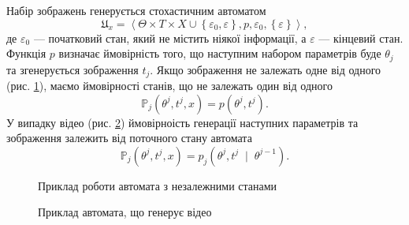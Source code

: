 Набір зображень генерується стохастичним автоматом \cite{Rabin:1963}
\begin{equation*}
  \mathfrak{U}_x = \left\langle
    \Theta \times T \times X
      \cup \left\{ \varepsilon_0, \varepsilon \right\}, p, \varepsilon_0,
    \left\{ \varepsilon \right\}
  \right\rangle,
\end{equation*}
де $\varepsilon_0$ --- початковий стан, який не містить ніякої інформації,
а $\varepsilon$ --- кінцевий стан.
Функція $p$ визначає ймовірність того,
що наступним набором параметрів буде $\theta_j$
та згенерується зображення $t_j$.
Якщо зображення не залежать одне від одного
(рис. \ref{fig:solutions:tree-images}),
маємо ймовірності станів,
що не залежать один від одного
\begin{equation*}
  \mathbb{P}_j\left( \theta^j, t^j, x \right)
  = p\left( \theta^j, t^j \right).
\end{equation*}
У випадку відео (рис. \ref{fig:solutions:tree-video})
ймовірноість генерації наступних параметрів та зображення
залежить від поточного стану автомата
\begin{equation*}
  \mathbb{P}_j\left( \theta^j, t^j, x \right)
  = p_j\left( \theta^j, t^j \; \mid \; \theta^{j-1} \right).
\end{equation*}

\begin{figure}[h]
  \centering
  
  \caption{Приклад роботи автомата з незалежними станами}
  \label{fig:solutions:tree-images}
\end{figure}

\begin{figure}[h]
  \centering
  
  \caption{Приклад автомата, що генерує відео}
  \label{fig:solutions:tree-video}
\end{figure}
